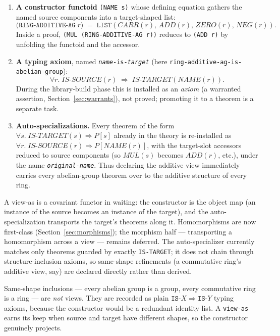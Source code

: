 \begin{enumerate}
\item \textbf{A constructor functoid} \texttt{(NAME s)} whose defining
  equation gathers the named source components into a target-shaped list:
  \[
    \mathtt{(RING\text{-}ADDITIVE\text{-}AG}\;r) \;=\;
      \mathtt{LIST}(\mathit{CARR}(r),\, \mathit{ADD}(r),\,
                    \mathit{ZERO}(r),\, \mathit{NEG}(r)).
  \]
  Inside a proof, \texttt{(MUL (RING-ADDITIVE-AG r))} reduces to
  \texttt{(ADD r)} by unfolding the functoid and the accessor.

\item \textbf{A typing axiom}, named
  \texttt{\textit{name}-is-\textit{target}} (here
  \texttt{ring-additive-ag-is-abelian-group}):
  \[
    \forall r.\; \mathit{IS\text{-}SOURCE}(r) \;\Rightarrow\;
      \mathit{IS\text{-}TARGET}(\mathit{NAME}(r)).
  \]
  During the library-build phase this is installed as an \emph{axiom}
  (a warranted assertion, Section~\ref{sec:warrants}), not proved;
  promoting it to a theorem is a separate task.

\item \textbf{Auto-specializations.}  Every theorem of the form
  $\forall s.\; \mathit{IS\text{-}TARGET}(s) \Rightarrow P[s]$ already in
  the theory is re-installed as
  $\forall r.\; \mathit{IS\text{-}SOURCE}(r) \Rightarrow P[\mathit{NAME}(r)]$,
  with the target-slot accessors reduced to source components (so
  $\mathit{MUL}(s)$ becomes $\mathit{ADD}(r)$, etc.), under the name
  \texttt{\textit{original}-\textit{name}}.  Thus declaring the additive
  view immediately carries every abelian-group theorem over to the
  additive structure of every ring.
\end{enumerate}

\begin{remark}
A view-as is a covariant functor in waiting: the constructor is the
object map (an instance of the source becomes an instance of the
target), and the auto-specialization transports the target's theorems
along it.  Homomorphisms are now first-class
(Section~\ref{sec:morphisms}); the morphism half --- transporting a
homomorphism across a view --- remains deferred.  The
auto-specializer currently matches only theorems guarded by exactly
\texttt{IS-TARGET}; it does not chain through structure-inclusion axioms,
so same-shape refinements (a commutative ring's additive view, say) are
declared directly rather than derived.
\end{remark}

\begin{remark}
Same-shape inclusions --- every abelian group is a group, every
commutative ring is a ring --- are \emph{not} views.  They are recorded
as plain $\texttt{IS-}X \Rightarrow \texttt{IS-}Y$ typing axioms, because
the constructor would be a redundant identity list.  A \texttt{view-as}
earns its keep when source and target have different shapes, so the
constructor genuinely projects.
\end{remark}

